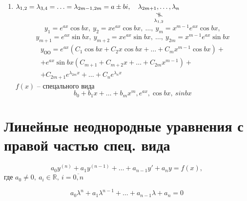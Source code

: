\documentclass[11pt,a4paper,oneside]{report}
\newcommand{\vertneq}[0]{\rotatebox{90}{$\ne$}}
\newcommand{\nequalto}[2]{\underset{\scriptstyle\overset{\mkern4mu\vertneq}{#2}}{#1}}
\theoremstyle{definition}
\theoremstyle{plain}
\theoremstyle{remark}
\begin{document}
\begin{enumerate}
    \item $\lambda_{1,2} = \lambda_{3,4} = \ldots = \lambda_{2m-1,2m} = a\pm bi, \quad \nequalto{\lambda_{2m+1},\ldots,\lambda_n}{\lambda_{1,2}}$
          \begin{equation*}
              y_1 = e^{ax}\cos bx, \ y_2 = xe^{ax}\cos bx,\ \ldots, \ y_m = x^{m-1}e^{ax}\cos bx,
          \end{equation*}
          \begin{equation*}
              y_{m+1} = e^{ax}\sin bx, \ y_{m+2} = xe^{ax}\sin bx, \ \ldots, \ y_{2m} = x^{m-1}e^{ax}\sin bx
          \end{equation*}
          \begin{multline*}
              y_{\text{ОО}} = e^{ax}(C_1\cos bx + C_2 x \cos bx + \ldots + C_m x^{m-1}\cos bx) + \\
              + e^{ax}\sin bx(C_{m+1} + C_{m+2}x + \ldots + C_{2m}x^{m-1}) + \\
              + C_{2m+1}e^{\lambda_{2m}x} + \ldots + C_ne^{\lambda_n x}
          \end{multline*}
          $f(x)$ -- спецального вида
          \begin{equation*}
              b_0 + b_1x + \ldots + b_m x^m, e^{ax}, \cos bx, \ sin bx
          \end{equation*}
\end{enumerate}

\section{Линейные неоднородные уравнения с правой частью спец. вида}

\begin{equation}\label{eq42}
    a_0y^{(n)} + a_1y^{(n-1)} + \ldots + a_{n-1}y' + a_ny = f(x),
\end{equation}
где $a_0 \ne 0, \ a_i \in \mathbb{R}, \ i = \overline{0,n}$

\begin{equation}\label{eq43}
    a_0\lambda^n + a_1\lambda^{n-1} + \ldots + a_{n-1}\lambda + a_n = 0
\end{equation}
\end{document}
